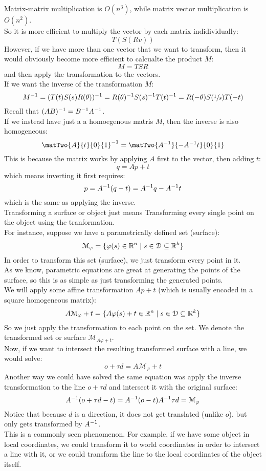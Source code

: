 \documentclass[12pt]{article}
\begin{document}
Matrix-matrix multiplication is $O(n^3)$,
while matrix vector multiplication is $O(n^2)$. \\
So it is more efficient to multiply the vector
by each matrix indidividually:
\[ T(S(Rv)) \]
However, if we have more than one vector
that we want to transform,
then it would obviously become more efficient
to calcualte the product $M$:
\[ M = TSR \]
and then apply the transformation to the vectors. \\

If we want the inverse of the transformation $M$:
\[ M^{-1} = (T(t)S(s)R(\theta))^{-1}
= R(\theta)^{-1} S(s)^{-1} T(t)^{-1} 
= R(-\theta)S(\sfrac{1}{s})T(-t) \]
Recall that $(AB)^{-1} = B^{-1} A^{-1}$. \\

If we instead have just a a homoegenous matris $M$,
then the inverse is also homogeneous:
\[ \matTwo{A}{t}{0}{1}\inv
= \matTwo{A\inv}{-A\inv t}{0}{1} \]
This is because the matrix works by applying $A$
first to the vector, then adding $t$:
\[ q = Ap + t \]
which means inverting it first requires:
\[ p = A^{-1}(q - t) = A^{-1} q -A^{-1} t \]
which is the same as applying the inverse. \\

Transforming a surface or object just means Transforming
every single point on the object using the tranformation. \\

For instance, suppose we have
a parametrically defined set (surface):
\[ \mathcal{M}_\varphi = 
\{ \varphi(s) \in \mathbb{R}^n \mid 
s \in \mathcal{D} \subseteq \mathbb{R}^k \} \]
In order to transform this set (surface),
we just transform every point in it. \\
As we know, parametric equations are great at
generating the points of the surface,
so this is as simple as just transforming the
generated points. \\
We will apply some affine transformation $Ap + t$
(which is usually encoded in a square
homogeneous matrix):
\[ A\mathcal{M}_\varphi + t
= \{ A\varphi(s) + t\in \mathbb{R}^n \mid 
s \in \mathcal{D} \subseteq \mathbb{R}^k \} \]
So we just apply the transformation
to each point on the set.
We denote the transformed set or surface
$\mathcal{M}_{A\varphi + t}$. \\

Now, if we want to intersect the resulting
transformed surface with a line,
we would solve:
\[ o + \tau d = A\mathcal{M}_\varphi + t \]
Another way we could have solved the same
equation was apply the inverse transformation
to the line $o + \tau d$
and intersect it with the original surface:
\[ A^{-1}(o + \tau d - t)
= A^{-1}(o - t) A^{-1} \tau d 
= \mathcal{M}_\varphi \]
Notice that because $d$ is a direction,
it does not get translated (unlike $o$),
but only gets transformed by $A^{-1}$. \\
This is a commonly seen phenomenon.
For example, if we have some object in
local coordinates, we could 
transform it to world coordinates
in order to intersect a line with it,
or we could transform the line to the local
coordinates of the object itself. \\
\end{document}
